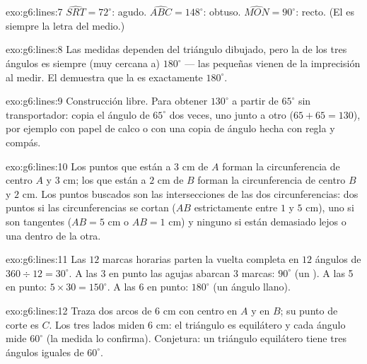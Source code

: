 \begin{solution}{exo:g6:lines:7}
$\widehat{SRT} = 72^\circ$: agudo. \quad
$\widehat{ABC} = 148^\circ$: obtuso. \quad
$\widehat{MON} = 90^\circ$: recto. (El  es siempre la letra
del medio.)
\end{solution}

\begin{solution}{exo:g6:lines:8}
Las medidas dependen del triángulo dibujado, pero la  de los tres ángulos
es siempre (muy cercana a) $180^\circ$ --- las pequeñas  vienen de
la imprecisión al medir. El  demuestra que la  es
exactamente $180^\circ$.
\end{solution}

\begin{solution}{exo:g6:lines:9}
Construcción libre. Para obtener $130^\circ$ a partir de $65^\circ$ sin
transportador: copia el ángulo de $65^\circ$ dos veces, uno junto a otro ($65 + 65 =
130$), por ejemplo con papel de calco o con una copia de ángulo hecha con regla
y compás.
\end{solution}

\begin{solution}{exo:g6:lines:10}
Los puntos que están a $3$ cm de $A$ forman la circunferencia de centro $A$ y 
$3$ cm; los que están a $2$ cm de $B$ forman la circunferencia de centro $B$ y
 $2$ cm. Los puntos buscados son las intersecciones de las dos
circunferencias: dos puntos si las circunferencias se cortan ($AB$ estrictamente entre $1$ y
$5$ cm), uno si son tangentes ($AB = 5$ cm o $AB = 1$ cm) y ninguno si están
demasiado lejos o una dentro de la otra.
\end{solution}

\begin{solution}{exo:g6:lines:11}
Las $12$ marcas horarias parten la vuelta completa en $12$ ángulos de
$360 \div 12 = 30^\circ$. A las 3 en punto las agujas abarcan $3$ marcas:
$90^\circ$ (un ). A las 5 en punto: $5 \times 30 = 150^\circ$.
A las 6 en punto: $180^\circ$ (un ángulo llano).
\end{solution}

\begin{solution}{exo:g6:lines:12}
Traza dos arcos de  $6$ cm con centro en $A$ y en $B$; su
punto de corte es $C$. Los tres lados miden $6$ cm: el triángulo es
equilátero y cada ángulo mide $60^\circ$ (la medida lo confirma).
Conjetura: un triángulo equilátero tiene tres ángulos iguales de
$60^\circ$.
\end{solution}


